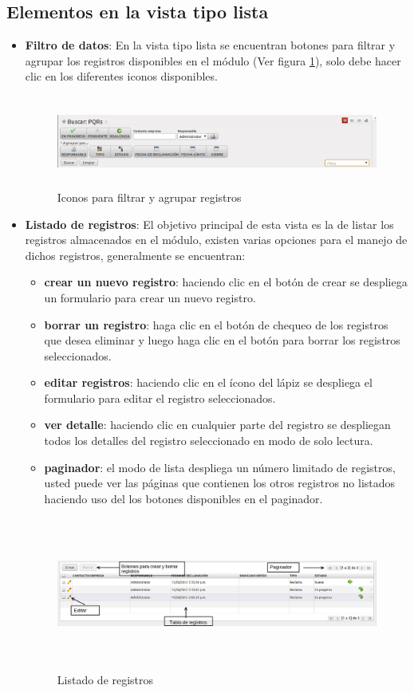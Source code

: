 \subsection{Elementos en la vista tipo lista}
\begin{itemize}
 \item \textbf{Filtro de datos}: En la vista tipo lista se encuentran botones para filtrar y agrupar los registros disponibles en el módulo (Ver figura \ref{fig:filtro}), solo debe hacer clic en los diferentes iconos disponibles.
  \begin{figure}[H]
  \centering
  \includegraphics[width=15cm,height=3cm]{./Imagenes/filtro.png}
    \caption{Iconos para filtrar y agrupar registros}
  \label{fig:filtro}
  \end{figure}

 \item \textbf{Listado de registros}: El objetivo principal de esta vista es la de listar los registros almacenados en el módulo, existen varias opciones para el manejo de dichos registros, generalmente se encuentran:
 \begin{itemize}
 \item \textbf{crear un nuevo registro}: haciendo clic en el botón de crear se despliega un formulario para crear un nuevo registro.
 \item \textbf{borrar un registro}: haga clic en el botón de chequeo de los registros que desea eliminar y luego haga clic en el botón para borrar los registros seleccionados.
 \item \textbf{editar registros}: haciendo clic en el ícono del lápiz se despliega el formulario para editar el registro seleccionados.
 \item \textbf{ver detalle}: haciendo clic en cualquier parte del registro se despliegan todos los detalles del registro seleccionado en modo de solo lectura.
 \item \textbf{paginador}: el modo de lista despliega un número limitado de registros, usted puede ver las páginas que contienen los otros registros no listados haciendo uso del los botones disponibles en el paginador.
 \end{itemize}
  \begin{figure}[H]
  \centering
  \includegraphics[width=17cm,height=5cm]{./Imagenes/listadoregistros.png}
    \caption{Listado de registros}
  \label{fig:listadoregistros}
  \end{figure}


\end{itemize}

